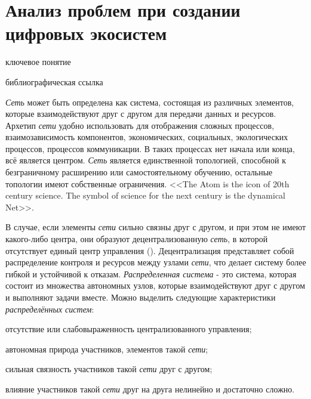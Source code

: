 \section{Анализ проблем при создании цифровых экосистем}
{\label{sec_ecosystem_analysis}} 

\begin{SCn}

\begin{scnrelfromlist}{ключевое понятие}
\end{scnrelfromlist}


\begin{scnrelfromlist}{библиографическая ссылка}
\end{scnrelfromlist}

\end{SCn}    

\textit{Сеть} может быть определена как система, состоящая из различных элементов, которые взаимодействуют друг с другом для передачи данных и ресурсов. Архетип \textit{сети} удобно использовать для отображения сложных процессов, взаимозависимость компонентов, экономических, социальных, экологических процессов, процессов коммуникации. В таких процессах нет начала или конца, всё является центром. \textit{Сеть} является единственной топологией, способной к безграничному расширению или самостоятельному обучению, остальные топологии имеют собственные ограничения. <<The Atom is the icon of 20th century science. The symbol of science for the next century is the dynamical Net>>.

\begin{SCn}
\end{SCn}

В случае, если элементы \textit{сети} сильно связны друг с другом, и при этом не имеют какого-либо центра, они образуют децентрализованную \textit{сеть}, в которой отсутствует единый центр управления (). Децентрализация представляет собой распределение контроля и ресурсов между узлами \textit{сети}, что делает систему более гибкой и устойчивой к отказам. \textit{Распределенная система} - это система, которая состоит из множества автономных узлов, которые взаимодействуют друг с другом и выполняют задачи вместе.
Можно выделить следующие характеристики \textit{распределённых систем}:
\begin{textitemize}
    \item отсутствие или слабовыраженность централизованного управления;
    \item автономная природа участников, элементов такой \textit{сети};
    \item сильная связность участников такой \textit{сети} друг с другом;
    \item влияние участников такой \textit{сети} друг на друга нелинейно и достаточно сложно.
\end{textitemize}

